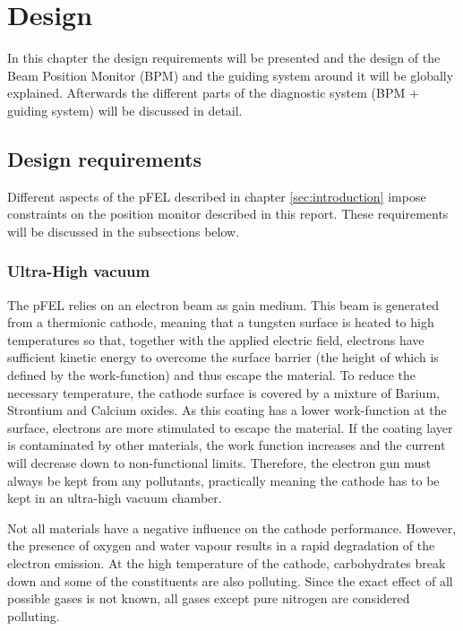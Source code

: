 \chapter{Design}
\label{sec:design}
In this chapter the design requirements will be presented and the design of the Beam Position Monitor (BPM) and the guiding system around it will be globally explained. Afterwards the different parts of the diagnostic system (BPM + guiding system) will be discussed in detail.

\section{Design requirements}
Different aspects of the pFEL described in chapter \ref{sec:introduction} impose constraints on the position monitor described in this report. These requirements will be discussed in the subsections below.

\subsection{Ultra-High vacuum}
The pFEL relies on an electron beam as gain medium. This beam is generated from a thermionic cathode, meaning that a tungsten surface is heated to high temperatures so that, together with the applied electric field, electrons have sufficient kinetic energy to overcome the surface barrier (the height of which is defined by the work-function) and thus escape the material. To reduce the necessary temperature, the cathode surface is covered by a mixture of Barium, Strontium and Calcium oxides. As this coating has a lower work-function at the surface, electrons are more stimulated to escape the material.
If the coating layer is contaminated by other materials, the work function increases and the current will decrease down to non-functional limits. Therefore, the electron gun must always be kept from any pollutants, practically meaning the cathode has to be kept in an ultra-high vacuum chamber.

Not all materials have a negative influence on the cathode performance. However, the presence of oxygen and water vapour results in a rapid degradation of the electron emission. At the high temperature of the cathode, carbohydrates break  down and some of the constituents are also polluting.
Since the exact effect of all possible gases is not known, all gases except pure nitrogen are considered polluting.

